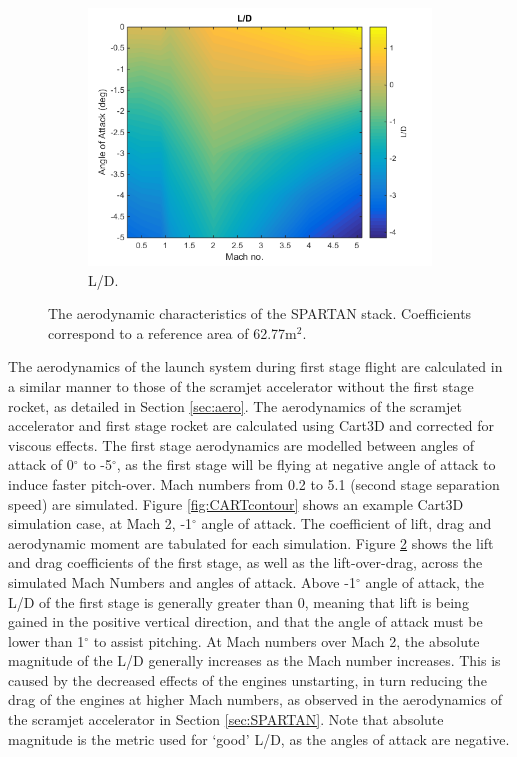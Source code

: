 \begin{figure}[ht]
\begin{subfigure}{.5\textwidth}
    		\centering
    		\includegraphics[width=0.99\linewidth]{figures/3_vehicle_design/FirstStageLD}
    		\caption{L/D.}
    		\label{fig:LD-EFirstStage}
    	\end{subfigure}
    	\caption{The aerodynamic characteristics of the SPARTAN stack.  Coefficients correspond to a reference area of 62.77m$^2$.}
    	\label{fig:FirstStageAero}
    \end{figure}
  The aerodynamics of the launch system during first stage flight are calculated in a similar manner to those of the scramjet accelerator without the first stage rocket, as detailed in Section \ref{sec:aero}. 
  The aerodynamics of the scramjet accelerator and first stage rocket are calculated using Cart3D and corrected for viscous effects. The first stage aerodynamics are modelled between angles of attack of 0$^\circ$ to -5$^\circ$, as the first stage will be flying at negative angle of attack to induce faster pitch-over. Mach numbers from 0.2 to 5.1 (second stage separation speed) are simulated. Figure \ref{fig:CARTcontour} shows an example Cart3D simulation case, at Mach 2, -1$^\circ$ angle of attack. The coefficient of lift, drag and aerodynamic moment are tabulated for each simulation. Figure \ref{fig:FirstStageAero} shows the lift and drag coefficients of the first stage, as well as the lift-over-drag, across the simulated Mach Numbers and angles of attack. Above -1$^\circ$ angle of attack, the L/D of the first stage is generally greater than 0, meaning that lift is being gained in the positive vertical direction, and that the angle of attack must be lower than 1$^\circ$ to assist pitching.
  At Mach numbers over Mach 2, the absolute magnitude of the L/D generally increases as the Mach number increases. This is caused by the decreased effects of the engines unstarting, in turn reducing the drag of the engines at higher Mach numbers, as observed in the aerodynamics of the scramjet accelerator in Section \ref{sec:SPARTAN}. 
   Note that absolute magnitude is the metric used for `good' L/D, as the angles of attack are negative. 
  

